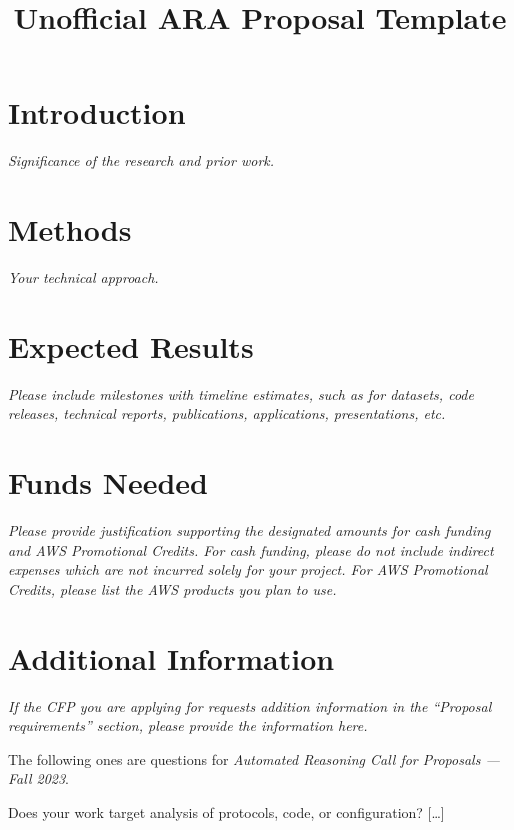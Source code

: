 \documentclass[titlesec]{araproposal}
\title{Unofficial ARA Proposal Template}
\date{}
\begin{document}
\maketitle



\section{Introduction}
\textit{Significance of the research and prior work.}

\section{Methods}
\textit{Your technical approach.}

\section{Expected Results}
\textit{Please include milestones with timeline estimates, such as for datasets, code
releases, technical reports, publications, applications, presentations, etc.}

\section{Funds Needed}
\textit{Please provide justification supporting the designated amounts for cash
funding and AWS Promotional Credits. For cash funding, please do not include
indirect expenses which are not incurred solely for your project. For AWS
Promotional Credits, please list the AWS products you plan to use.}


\section{Additional Information}
\textit{If the CFP you are applying for requests addition information in the “Proposal
requirements” section, please provide the information here.}

The following ones are questions for \textit{Automated Reasoning Call for
Proposals --- Fall 2023}.

\begin{question}
  Does your work target analysis of protocols, code, or configuration? {[\dots]} %
\end{question}
\end{document}
